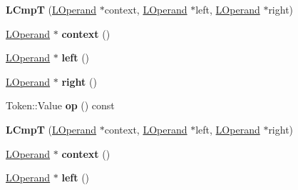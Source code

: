 \begin{DoxyCompactItemize}
\item 
{\bfseries L\+CmpT} (\hyperlink{classv8_1_1internal_1_1_l_operand}{L\+Operand} $\ast$context, \hyperlink{classv8_1_1internal_1_1_l_operand}{L\+Operand} $\ast$left, \hyperlink{classv8_1_1internal_1_1_l_operand}{L\+Operand} $\ast$right)\hypertarget{classv8_1_1internal_1_1_l_cmp_t_af9639e776ae4b34555d2d8b124fd06a2}{}\label{classv8_1_1internal_1_1_l_cmp_t_af9639e776ae4b34555d2d8b124fd06a2}

\item 
\hyperlink{classv8_1_1internal_1_1_l_operand}{L\+Operand} $\ast$ {\bfseries context} ()\hypertarget{classv8_1_1internal_1_1_l_cmp_t_a0beea53d13e064416006b17596aae2a1}{}\label{classv8_1_1internal_1_1_l_cmp_t_a0beea53d13e064416006b17596aae2a1}

\item 
\hyperlink{classv8_1_1internal_1_1_l_operand}{L\+Operand} $\ast$ {\bfseries left} ()\hypertarget{classv8_1_1internal_1_1_l_cmp_t_a6468d4b481e8c5ea5d268ad8b9bb0770}{}\label{classv8_1_1internal_1_1_l_cmp_t_a6468d4b481e8c5ea5d268ad8b9bb0770}

\item 
\hyperlink{classv8_1_1internal_1_1_l_operand}{L\+Operand} $\ast$ {\bfseries right} ()\hypertarget{classv8_1_1internal_1_1_l_cmp_t_a13a757622a5ddbff0584adc3b84baa8d}{}\label{classv8_1_1internal_1_1_l_cmp_t_a13a757622a5ddbff0584adc3b84baa8d}

\item 
Token\+::\+Value {\bfseries op} () const \hypertarget{classv8_1_1internal_1_1_l_cmp_t_affeb8a538e036a9115089631b13671f8}{}\label{classv8_1_1internal_1_1_l_cmp_t_affeb8a538e036a9115089631b13671f8}

\item 
{\bfseries L\+CmpT} (\hyperlink{classv8_1_1internal_1_1_l_operand}{L\+Operand} $\ast$context, \hyperlink{classv8_1_1internal_1_1_l_operand}{L\+Operand} $\ast$left, \hyperlink{classv8_1_1internal_1_1_l_operand}{L\+Operand} $\ast$right)\hypertarget{classv8_1_1internal_1_1_l_cmp_t_af9639e776ae4b34555d2d8b124fd06a2}{}\label{classv8_1_1internal_1_1_l_cmp_t_af9639e776ae4b34555d2d8b124fd06a2}

\item 
\hyperlink{classv8_1_1internal_1_1_l_operand}{L\+Operand} $\ast$ {\bfseries context} ()\hypertarget{classv8_1_1internal_1_1_l_cmp_t_a0beea53d13e064416006b17596aae2a1}{}\label{classv8_1_1internal_1_1_l_cmp_t_a0beea53d13e064416006b17596aae2a1}

\item 
\hyperlink{classv8_1_1internal_1_1_l_operand}{L\+Operand} $\ast$ {\bfseries left} ()\hypertarget{classv8_1_1internal_1_1_l_cmp_t_a6468d4b481e8c5ea5d268ad8b9bb0770}{}\label{classv8_1_1internal_1_1_l_cmp_t_a6468d4b481e8c5ea5d268ad8b9bb0770}


\end{DoxyCompactItemize}

